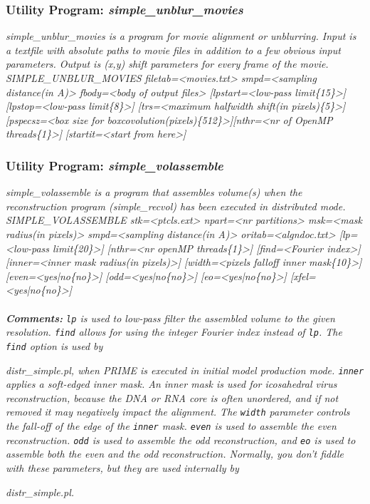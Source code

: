 \documentclass[review]{elsarticle}
\begin{document}
{{{{{\subsubsection{Utility Program: {\it{simple\_unblur\_movies}}}
\label{unblur_movies}
{\it{simple\_unblur\_movies} is a program for movie alignment or unblurring. Input is a textfile with absolute paths to movie files in addition to a few obvious input parameters. Output is (x,y) shift parameters for every frame of the movie.}\\
{\it{SIMPLE\_UNBLUR\_MOVIES filetab=<movies.txt> smpd=<sampling distance(in A)>}}
{\it{fbody=<body of output files> [lpstart=<low-pass limit\{15\}>] [lpstop=<low-pass}}
{\it{limit\{8\}>] [trs=<maximum halfwidth shift(in pixels)\{5\}>] [pspecsz=<box size}}
{\it{for boxcovolution(pixels)\{512\}>][nthr=<nr of OpenMP threads\{1\}>]}}
{\it{[startit=<start from here>]}}

\subsubsection{Utility Program: {\it{simple\_volassemble}}}
\label{volassemble}
{\it{simple\_volassemble} is a program that assembles volume(s) when the reconstruction program ({\it{simple\_recvol}) has been executed in distributed mode.}\\
{\it{SIMPLE\_VOLASSEMBLE stk=<ptcls.ext> npart=<nr partitions> msk=<mask radius(in}}
{\it{pixels)> smpd=<sampling distance(in A)> oritab=<algndoc.txt> [lp=<low-pass}}
{\it{limit\{20\}>] [nthr=<nr openMP threads\{1\}>] [find=<Fourier index>]}}
{\it{[inner=<inner mask radius(in pixels)>] [width=<pixels falloff inner}}
{\it{mask\{10\}>] [even=<yes|no\{no\}>] [odd=<yes|no\{no\}>] [eo=<yes|no\{no\}>]}}
{\it{[xfel=<yes|no\{no\}>]}}
\\\\
\noindent\textbf{Comments:} \texttt{lp} is used to low-pass filter the assembled volume to the given resolution. \texttt{find} allows for using the integer Fourier index instead of \texttt{lp}. The \texttt{find} option is used by {\it{distr\_simple.pl}, when PRIME is executed in initial model production mode. \texttt{inner} applies a soft-edged inner mask. An inner mask is used for icosahedral virus reconstruction, because the DNA or RNA core is often unordered, and if not removed it may negatively impact the alignment. The \texttt{width} parameter controls the fall-off of the edge of the \texttt{inner} mask. \texttt{even} is used to assemble the even reconstruction. \texttt{odd} is used to assemble the odd reconstruction, and \texttt{eo} is used to assemble both the even and the odd reconstruction. Normally, you don't fiddle with these parameters, but they are used internally by {\it{distr\_simple.pl}.

}}}}}}}}
\end{document}
